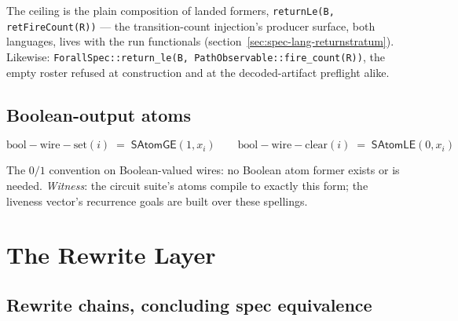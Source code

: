 The ceiling is the plain composition of landed formers,
\texttt{returnLe(B, retFireCount(R))} --- the transition-count
injection's producer surface, both languages, lives with the run
functionals (section~\ref{sec:spec-lang-returnstratum}).
Likewise:
\texttt{ForallSpec::return\_le(B, PathObservable::fire\_count(R))},
the empty roster refused at construction and at the decoded-artifact
preflight alike.

\subsection{Boolean-output atoms}
\label{sec:spec-lang-dbool}

\[
\mathrm{bool{-}wire{-}set}(i) \;=\; \mathsf{SAtomGE}(1, x_i)
\qquad
\mathrm{bool{-}wire{-}clear}(i) \;=\; \mathsf{SAtomLE}(0, x_i)
\]

The $0/1$ convention on Boolean-valued wires: no Boolean atom former
exists or is needed. \emph{Witness}: the circuit suite's atoms
compile to exactly this form; the liveness vector's recurrence goals
are built over these spellings.



\section{The Rewrite Layer}
\label{sec:spec-lang-rewrite}

\subsection{Rewrite chains, concluding spec equivalence}
\label{sec:spec-lang-rewritelayer}


